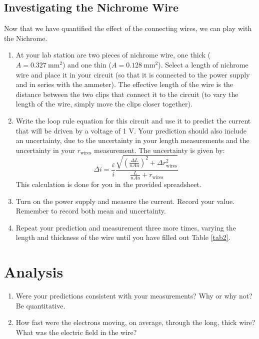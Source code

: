 \documentclass[12pt]{article}
\begin{document}
		\subsection*{Investigating the Nichrome Wire}
		Now that we have quantified the effect of the connecting wires, we can play with the Nichrome. 
		\begin{enumerate}
			\item At your lab station are two pieces of nichrome wire, one thick ($A=0.327\ \mathrm{mm}^2$) and one thin ($A=0.128\ \mathrm{mm}^2$). Select a length of nichrome wire and place it in your circuit (so that it is connected to the power supply and in series with the ammeter). The effective length of the wire is the distance between the two clips that connect it to the circuit (to vary the length of the wire, simply move the clips closer together).
			\item Write the loop rule equation for this circuit and use it to predict the current that will be driven by a voltage of 1 V. Your prediction should also include an uncertainty, due to the uncertainty in your length measurements and the uncertainty in your $r_\mathrm{wires}$ measurement. The uncertainty is given by:
			\begin{equation*}
				\Delta i = \frac{\varepsilon}{i}\frac{ \sqrt{\left(\frac{\Delta L}{nAu}\right)^2+\Delta r_\mathrm{wires}^2}  }{\frac{L}{nAu}+r_\mathrm{wires}}
			\end{equation*}
			This calculation is done for you in the provided spreadsheet.
			\item Turn on the power supply and measure the current. Record your value. Remember to record both mean and uncertainty.
			\item Repeat your prediction and measurement three more times, varying the length and thickness of the wire until you have filled out Table \ref{tab2}.
		\end{enumerate}
	
	\section*{Analysis}
	\begin{enumerate}
		\item Were your predictions consistent with your measurements? Why or why not? Be quantitative.
		\item How fast were the electrons moving, on average, through the long, thick wire? What was the electric field in the wire?
	\end{enumerate}
	
\end{document}
